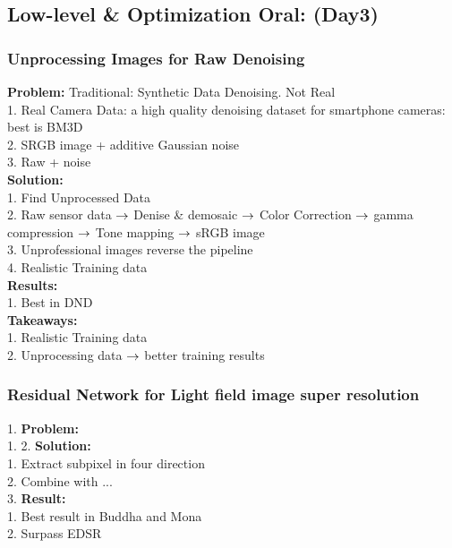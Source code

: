 \subsection{Low-level \& Optimization Oral: (Day3)}
\subsubsection{Unprocessing Images for Raw Denoising}
{\bf Problem:} Traditional: Synthetic Data Denoising. Not Real \\
        1. Real Camera Data: a high quality denoising dataset for smartphone cameras: best is BM3D \\
        2. SRGB image + additive Gaussian noise \\
        3. Raw + noise\\
{\bf {\bf Solution:}} \\
        1. Find Unprocessed Data \\
        2. Raw sensor data $\rightarrow$ Denise \& demosaic $\rightarrow$ Color Correction $\rightarrow$ gamma compression $\rightarrow$ Tone mapping $\rightarrow$ sRGB image \\
        3. Unprofessional images reverse the pipeline \\
        4. Realistic Training data\\
{\bf Results:} \\
        1. Best in DND\\
{\bf Takeaways:} \\
        1. Realistic Training data \\
        2. Unprocessing data $\rightarrow$ better training results \\
\subsubsection{Residual Network for Light field image super resolution}
    1. {\bf Problem:} \\
        1. 
    2. {\bf Solution:} \\
        1. Extract subpixel in four direction \\
        2. Combine with ... \\
    3. {\bf Result:} \\
        1. Best result in Buddha and Mona \\
        2. Surpass EDSR \\
